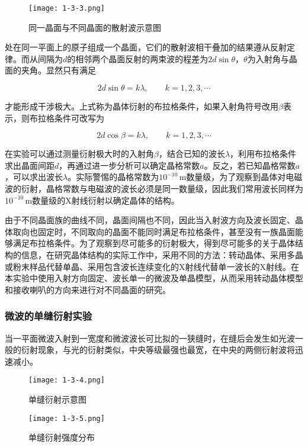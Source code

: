 \documentclass[12pt]{article}
\begin{document}
\begin{figure}[htbp]
    \centering
    \texttt{[image: 1-3-3.png]}
    \caption{同一晶面与不同晶面的散射波示意图}
\end{figure}

处在同一平面上的原子组成一个晶面，它们的散射波相干叠加的结果遵从反射定律。而从间隔为$ d $的相邻两个晶面反射的两束波的程差为$ 2d\sin\theta$，$\theta$为入射角与晶面的夹角。显然只有满足

\[
    2d\sin\theta=k\lambda,\qquad k=1,2,3,\cdots
\]

才能形成干涉极大。上式称为晶体衍射的布拉格条件，如果入射角符号改用$\beta$表示，则布拉格条件可改写为

\[
    2d\cos\beta=k\lambda,\qquad k=1,2,3,\cdots
\]

在实验可以通过测量衍射极大时的入射角$\beta$，结合已知的波长$\lambda$，利用布拉格条件求出晶面间距$d$，再通过进一步分析可以确定晶格常数$a$。反之，若已知晶格常数$a$，可以求出波长$\lambda$。实际警惕的晶格常数为$10^{-10}\,\mathrm{m}$数量级，为了观察到晶体对电磁波的衍射，晶格常数与电磁波的波长必须是同一数量级，因此我们常用波长同样为$10^{-10}\,\mathrm{m}$数量级的X射线衍射以确定晶体的结构。

由于不同晶面族的曲线不同，晶面间隔也不同，因此当入射波方向及波长固定、晶体取向也固定时，不同取向的晶面不能同时满足布拉格条件，甚至没有一族晶面能够满足布拉格条件。为了观察到尽可能多的衍射极大，得到尽可能多的关于晶体结构的信息，在研究晶体结构的实际工作中，采用不同的方法：转动晶体、采用多晶或粉末样品代替单晶、采用包含波长连续变化的X射线代替单一波长的X射线。在本实验中使用入射方向固定、波长单一的微波及单晶模型，从而采用转动晶体模型和接收喇叭的方向来进行对不同晶面的研究。

\subsubsection{微波的单缝衍射实验}
当一平面微波入射到一宽度和微波波长可比拟的一狭缝时，在缝后会发生如光波一般的衍射现象，与光的衍射类似，中央等级最强也最宽，在中央的两侧衍射波将迅速减小。

\begin{figure}[htbp]
    \centering
    \begin{minipage}[t]{0.3\textwidth}
        \centering
        \texttt{[image: 1-3-4.png]}
        \caption{单缝衍射示意图}
    \end{minipage}
    \qquad
    \begin{minipage}[t]{0.5\textwidth}
        \centering
        \texttt{[image: 1-3-5.png]}
        \caption{单缝衍射强度分布}
    \end{minipage}
\end{figure}
\end{document}
